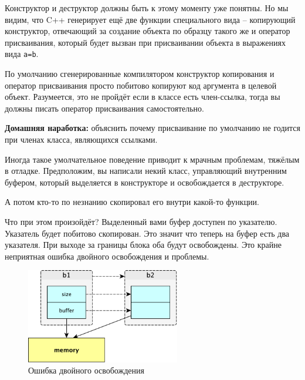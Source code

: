 \documentclass[a4paper,12pt,oneside]{article}
\begin{document}


Конструктор и деструктор должны быть к этому моменту уже понятны. Но мы видим, что C++ генерирует ещё две функции специального вида – копирующий конструктор, отвечающий за создание объекта по образцу такого же и оператор присваивания, который будет вызван при присваивании объекта в выражениях вида \lstinline!a=b!.



По умолчанию сгенерированные компилятором конструктор копирования и оператор присваивания просто побитово копируют код аргумента в целевой объект. Разумеется, это не пройдёт если в классе есть член-ссылка, тогда вы должны писать оператор присваивания самостоятельно.

\textbf{Домашняя наработка:} объяснить почему присваивание по умолчанию не годится при членах класса, являющихся ссылками.

Иногда такое умолчательное поведение приводит к мрачным проблемам, тяжёлым в отладке. Предположим, вы написали некий класс, управляющий внутренним буфером, который выделяется в конструкторе и освобождается в деструкторе.



А потом кто-то по незнанию скопировал его внутри какой-то функции.



Что при этом произойдёт? Выделенный вами буфер доступен по указателю. Указатель будет побитово скопирован. Это значит что теперь на буфер есть два указателя. При выходе за границы блока оба будут освобождены. Это крайне неприятная ошибка двойного освобождения и проблемы.

\begin{figure}[h!]
\centering
\includegraphics[width=0.6\textwidth]{illustrations/copying-crop.pdf}
\caption{Ошибка двойного освобождения}
\label{fig:copying-crop}
\end{figure}
\end{document}
